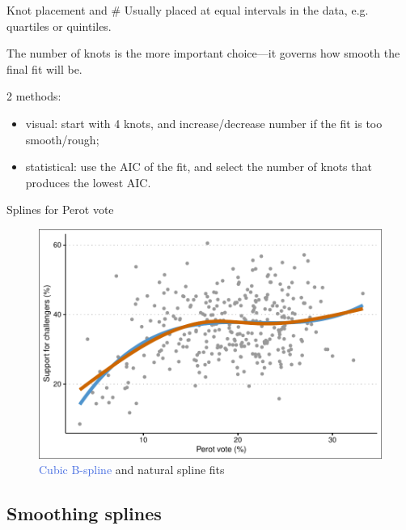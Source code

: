 \documentclass[12pt,english,pdf,xcolor=dvipsnames,aspectratio=169,handout]{beamer}\usepackage[]{graphicx}\usepackage[]{xcolor}
\begin{document}
\begin{frame}{Knot placement and \#}
  Usually placed at equal intervals in the data, e.g. quartiles or quintiles.\bigskip

  The number of knots is the more important choice---it governs how smooth the final fit will be.\bigskip

  2 methods:

  \begin{itemize}
  \item visual: start with 4 knots, and increase/decrease number if the fit is too smooth/rough;
  \item statistical: use the AIC of the fit, and select the number of knots that produces the lowest AIC.
  \end{itemize}
  
\end{frame}


\begin{frame}{Splines for Perot vote}
  


\begin{figure}
  \centering
  \includegraphics[scale=0.7]{../04-graphs/04-09}
  \caption{\textcolor{RoyalBlue}{Cubic B-spline} and \textcolor{RedOrange}{natural spline} fits}
\end{figure}

\end{frame}



\subsection{Smoothing splines}
\end{document}
